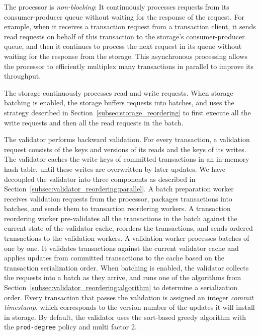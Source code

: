The processor is \emph{non-blocking}: It continuously processes requests from its consumer-producer queue without waiting for the response of the request. For example, when it receives a transaction request from a transaction client, it sends read requests on behalf of this transaction to the storage's consumer-producer queue, and then it continues to process the next request in its queue without waiting for the response from the storage. This asynchronous processing allows the processor to efficiently multiplex many transactions in parallel to improve its throughput.

The storage continuously processes read and write requests. When storage batching is enabled, the storage buffers requests into batches, and uses the strategy described in Section~\ref{subsec:storage_reordering} to first execute all the write requests and then all the read requests in the batch.

The validator performs backward validation. For every transaction, a validation request consists of the keys and versions of its reads and the keys of its writes. The validator caches the write keys of committed transactions in an in-memory hash table, until these writes are overwritten by later updates.
We have decoupled the validator into three components as described in Section~\ref{subsec:validator_reordering:parallel}. A batch preparation worker receives validation requests from the processor, packages transactions into batches, and sends them to transaction reordering workers. A transaction reordering worker pre-validates all the transactions in the batch against the current state of the validator cache, reorders the transactions, and sends ordered transactions to the validation workers. A validation worker processes batches of  one by one. It validates transactions against the current validator cache and applies updates from committed transactions to the cache based on the transaction serialization order.  When batching is enabled, the validator collects the requests into a batch as they arrive, and runs one of the algorithms from Section~\ref{subsec:validator_reordering:algorithm} to determine a serialization order. Every transaction that passes the validation is assigned an integer \emph{commit timestamp}, which corresponds to the version number of the updates it will install in storage. 
By default, the validator uses the sort-based greedy algorithm with the \texttt{prod-degree} policy and multi factor 2.


